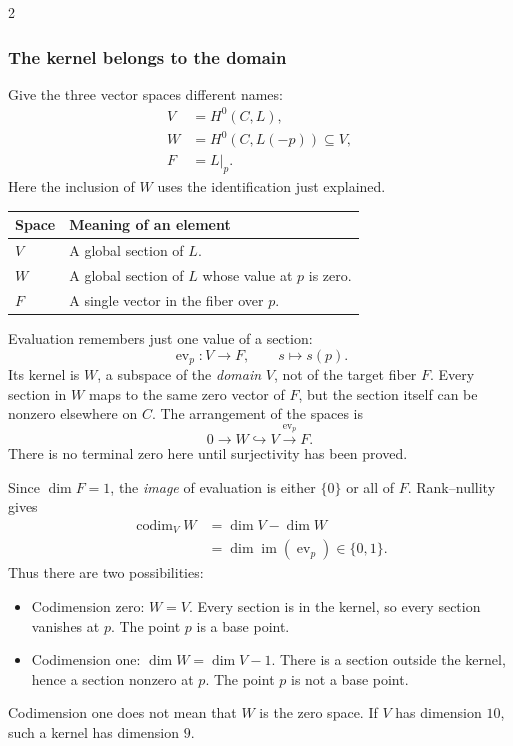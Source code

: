 \documentclass[12pt]{memoir}
\begin{document}
\begin{multicols}{2}
\subsubsection*{The kernel belongs to the domain}
Give the three vector spaces different names:
\[
\begin{aligned}
 V&=H^0(C,L),\\
 W&=H^0(C,L(-p))\subseteq V,\\
 F&=L|_p.
\end{aligned}
\]
Here the inclusion of $W$ uses the identification just explained.
\begin{center}
\begin{tabularx}{\linewidth}{@{}lX@{}}
\toprule
Space & Meaning of an element\\
\midrule
$V$ & A global section of $L$.\\
$W$ & A global section of $L$ whose value at $p$ is zero.\\
$F$ & A single vector in the fiber over $p$.\\
\bottomrule
\end{tabularx}
\end{center}

Evaluation remembers just one value of a section:
\[
 \operatorname{ev}_p:V\longrightarrow F,\qquad s\longmapsto s(p).
\]
Its kernel is $W$, a subspace of the \emph{domain} $V$, not of the
target fiber $F$. Every section in $W$ maps to the same zero vector
of $F$, but the section itself can be nonzero elsewhere on $C$.
The arrangement of the spaces is
\[
 0\longrightarrow W\hookrightarrow V
 \xrightarrow{\operatorname{ev}_p}F.
\]
There is no terminal zero here until surjectivity has been proved.

Since $\dim F=1$, the \emph{image} of evaluation is either $\{0\}$
or all of $F$. Rank--nullity gives
\[
\begin{aligned}
 \operatorname{codim}_V W
 &=\dim V-\dim W\\
 &=\dim\operatorname{im}(\operatorname{ev}_p)\in\{0,1\}.
\end{aligned}
\]
Thus there are two possibilities:
\begin{itemize}
\raggedright
\item Codimension zero: $W=V$. Every section is in the kernel,
so every section vanishes at $p$. The point $p$ is a base point.
\item Codimension one: $\dim W=\dim V-1$. There is a section outside
the kernel, hence a section nonzero at $p$. The point $p$ is not a
base point.
\end{itemize}
Codimension one does not mean that $W$ is the zero space. If $V$ has
dimension $10$, such a kernel has dimension $9$.


\end{multicols}
\end{document}
